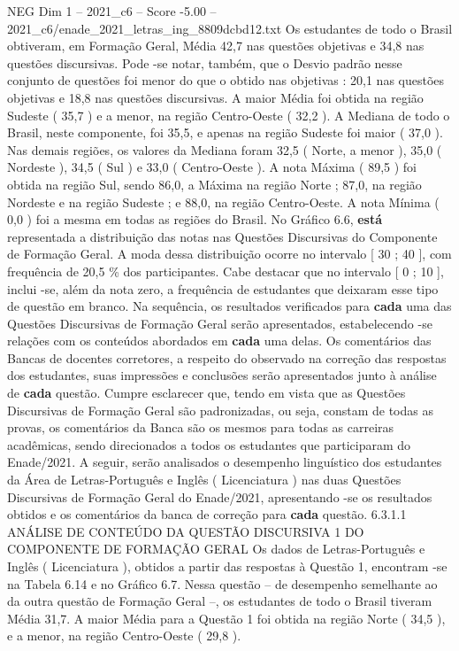 \begin{textsample}{NEG Dim 1 – 2021\_c6 – Score -5.00 – 2021\_c6/enade\_2021\_letras\_ing\_8809dcbd12.txt}
Os estudantes de todo o Brasil obtiveram, em Formação Geral, Média 42,7 nas questões objetivas e 34,8 nas questões discursivas.
Pode -se notar, também, que o Desvio padrão nesse conjunto de questões foi menor do que o obtido nas objetivas : 20,1 nas questões objetivas e 18,8 nas questões discursivas.
A maior Média foi obtida na região Sudeste ( 35,7 ) e a menor, na região Centro-Oeste ( 32,2 ).
A Mediana de todo o Brasil, neste componente, foi 35,5, e apenas na região Sudeste foi maior ( 37,0 ).
Nas demais regiões, os valores da Mediana foram 32,5 ( Norte, a menor ), 35,0 ( Nordeste ), 34,5 ( Sul ) e 33,0 ( Centro-Oeste ).
A nota Máxima ( 89,5 ) foi obtida na região Sul, sendo 86,0, a Máxima na região Norte ; 87,0, na região Nordeste e na região Sudeste ; e 88,0, na região Centro-Oeste.
A nota Mínima ( 0,0 ) foi a mesma em todas as regiões do Brasil.
No Gráfico 6.6, \textbf{está} representada a distribuição das notas nas Questões Discursivas do Componente de Formação Geral.
A moda dessa distribuição ocorre no intervalo [ 30 ; 40 ], com frequência de 20,5 \% dos participantes.
Cabe destacar que no intervalo [ 0 ; 10 ], inclui -se, além da nota zero, a frequência de estudantes que deixaram esse tipo de questão em branco.
Na sequência, os resultados verificados para \textbf{cada} uma das Questões Discursivas de Formação Geral serão apresentados, estabelecendo -se relações com os conteúdos abordados em \textbf{cada} uma delas.
Os comentários das Bancas de docentes corretores, a respeito do observado na correção das respostas dos estudantes, suas impressões e conclusões serão apresentados junto à análise de \textbf{cada} questão.
Cumpre esclarecer que, tendo em vista que as Questões Discursivas de Formação Geral são padronizadas, ou seja, constam de todas as provas, os comentários da Banca são os mesmos para todas as carreiras acadêmicas, sendo direcionados a todos os estudantes que participaram do Enade/2021.
A seguir, serão analisados o desempenho linguístico dos estudantes da Área de Letras-Português e Inglês ( Licenciatura ) nas duas Questões Discursivas de Formação Geral do Enade/2021, apresentando -se os resultados obtidos e os comentários da banca de correção para \textbf{cada} questão. 6.3.1.1 ANÁLISE DE CONTEÚDO DA QUESTÃO DISCURSIVA 1 DO COMPONENTE DE FORMAÇÃO GERAL Os dados de Letras-Português e Inglês ( Licenciatura ), obtidos a partir das respostas à Questão 1, encontram -se na Tabela 6.14 e no Gráfico 6.7.
Nessa questão – de desempenho semelhante ao da outra questão de Formação Geral –, os estudantes de todo o Brasil tiveram Média 31,7.
A maior Média para a Questão 1 foi obtida na região Norte ( 34,5 ), e a menor, na região Centro-Oeste ( 29,8 ).

\end{textsample}
